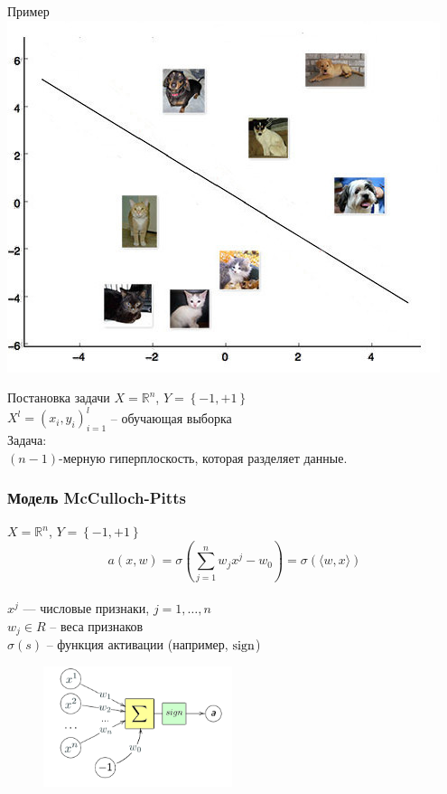 \documentclass[10pt]{beamer}
\begin{document}
\begin{frame}{Пример}
  \centering
  \includegraphics[width=0.9 \textwidth, keepaspectratio]{images/catdog1}
\end{frame}

\begin{frame}{Постановка задачи}
  $X = \mathbb{R}^n$, ${Y = \left\{ -1, + 1\right\}}$\\
  ${X^l = (x_i, y_i)_{i = 1}^l}$ -- обучающая выборка\\
  \bigbreak
  \alert{Задача}:\\
  $(n-1)$-мерную гиперплоскость, которая разделяет данные.
\end{frame}

\begin{frame}\frametitle{Модель McCulloch-Pitts}
  $X = \mathbb{R}^n$, ${Y = \left\{ -1, + 1\right\}}$\\
	\pause
	$$a(x,w) = \sigma(\sum\limits_{j=1}^n w_j x^j - w_0) = \sigma(\langle w, x \rangle)$$\\
  $x^j$ — числовые признаки, $j = 1,\dots, n$ \\	
	$w_j \in R$ -- веса признаков\\
	$\sigma(s)$ -- функция активации (например, $\operatorname{sign}$)
	\pause
	\begin{figure}[htbp]
	  \includegraphics[height=100pt, keepaspectratio = true]{images/neuron-scheme}   
	\end{figure}
\end{frame}
\end{document}
